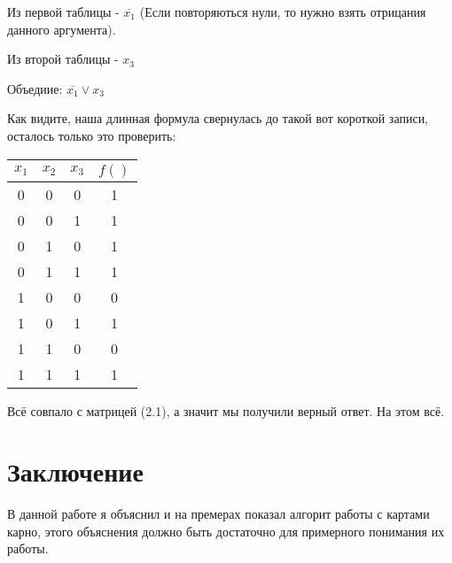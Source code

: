 \documentclass{article}
\begin{document}
\vspace{1em}

Из первой таблицы - $\overline{x_{1}}$  (Если повторяються нули, то нужно взять отрицания данного аргумента).

Из второй таблицы - $x_{3}$

\vspace{1em}

Объедиие:  $\overline{x_{1}} \lor x_{3}$

\vspace{1em}

Как видите, наша длинная формула свернулась до такой вот короткой записи, осталось только это проверить:

\begin{tabular}{c|c|c|c}
$x_{1}$ & $x_{2}$ & $x_{3}$ & $f()$ \\
\hline
0 & 0 & 0 & 1 \\
0 & 0 & 1 & 1 \\
0 & 1 & 0 & 1 \\
0 & 1 & 1 & 1 \\
1 & 0 & 0 & 0 \\
1 & 0 & 1 & 1 \\
1 & 1 & 0 & 0\\
1 & 1 & 1 & 1 \\
\end{tabular}

\vspace{1em}

Всё совпало с матрицей (2.1), а значит мы получили верный ответ. На этом всё.

\section{Заключение}

В данной работе я объяснил и на премерах показал алгорит работы с картами карно, этого объяснения должно быть достаточно для примерного понимания их работы.
\end{document}
